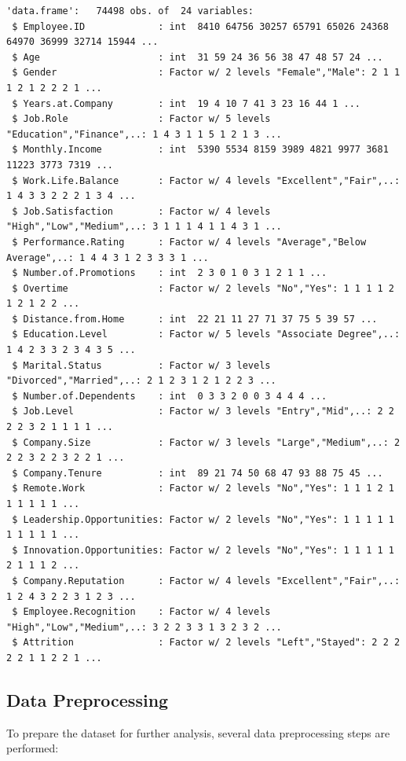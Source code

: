 \documentclass[
  10pt,
  paper=a4,
  ,captions=tableheading
]{scrartcl}
\begin{document}
\begin{verbatim}
'data.frame':   74498 obs. of  24 variables:
 $ Employee.ID             : int  8410 64756 30257 65791 65026 24368 64970 36999 32714 15944 ...
 $ Age                     : int  31 59 24 36 56 38 47 48 57 24 ...
 $ Gender                  : Factor w/ 2 levels "Female","Male": 2 1 1 1 2 1 2 2 2 1 ...
 $ Years.at.Company        : int  19 4 10 7 41 3 23 16 44 1 ...
 $ Job.Role                : Factor w/ 5 levels "Education","Finance",..: 1 4 3 1 1 5 1 2 1 3 ...
 $ Monthly.Income          : int  5390 5534 8159 3989 4821 9977 3681 11223 3773 7319 ...
 $ Work.Life.Balance       : Factor w/ 4 levels "Excellent","Fair",..: 1 4 3 3 2 2 2 1 3 4 ...
 $ Job.Satisfaction        : Factor w/ 4 levels "High","Low","Medium",..: 3 1 1 1 4 1 1 4 3 1 ...
 $ Performance.Rating      : Factor w/ 4 levels "Average","Below Average",..: 1 4 4 3 1 2 3 3 3 1 ...
 $ Number.of.Promotions    : int  2 3 0 1 0 3 1 2 1 1 ...
 $ Overtime                : Factor w/ 2 levels "No","Yes": 1 1 1 1 2 1 2 1 2 2 ...
 $ Distance.from.Home      : int  22 21 11 27 71 37 75 5 39 57 ...
 $ Education.Level         : Factor w/ 5 levels "Associate Degree",..: 1 4 2 3 3 2 3 4 3 5 ...
 $ Marital.Status          : Factor w/ 3 levels "Divorced","Married",..: 2 1 2 3 1 2 1 2 2 3 ...
 $ Number.of.Dependents    : int  0 3 3 2 0 0 3 4 4 4 ...
 $ Job.Level               : Factor w/ 3 levels "Entry","Mid",..: 2 2 2 2 3 2 1 1 1 1 ...
 $ Company.Size            : Factor w/ 3 levels "Large","Medium",..: 2 2 2 3 2 2 3 2 2 1 ...
 $ Company.Tenure          : int  89 21 74 50 68 47 93 88 75 45 ...
 $ Remote.Work             : Factor w/ 2 levels "No","Yes": 1 1 1 2 1 1 1 1 1 1 ...
 $ Leadership.Opportunities: Factor w/ 2 levels "No","Yes": 1 1 1 1 1 1 1 1 1 1 ...
 $ Innovation.Opportunities: Factor w/ 2 levels "No","Yes": 1 1 1 1 1 2 1 1 1 2 ...
 $ Company.Reputation      : Factor w/ 4 levels "Excellent","Fair",..: 1 2 4 3 2 2 3 1 2 3 ...
 $ Employee.Recognition    : Factor w/ 4 levels "High","Low","Medium",..: 3 2 2 3 3 1 3 2 3 2 ...
 $ Attrition               : Factor w/ 2 levels "Left","Stayed": 2 2 2 2 2 1 1 2 2 1 ...
\end{verbatim}

\small

\subsection{Data Preprocessing}\label{data-preprocessing}

To prepare the dataset for further analysis, several data preprocessing
steps are performed:
\end{document}
